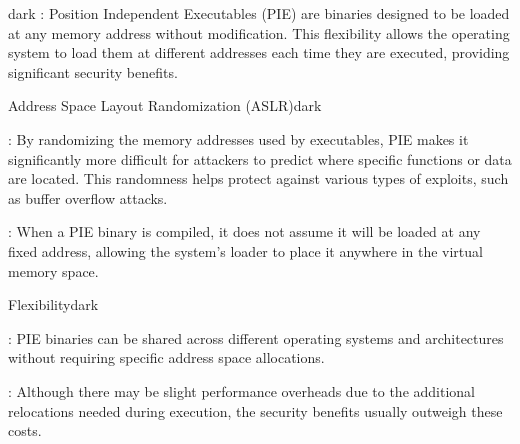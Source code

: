 \label{Position Independent Executables (PIE)}
\begin{baseBoxThree}{}{dark}
    \bigskip
    : Position Independent Executables (PIE) are binaries designed to be loaded at any memory address without modification. This flexibility allows the operating system to load them at different addresses each time they are executed, providing significant security benefits.
    \bigskip
    \label{Address Space Layout Randomization (ASLR)}
    \begin{baseBoxThree}{Address Space Layout Randomization (ASLR)}{dark}
        \begin{posnexItemize}
            \item[\sA] : By randomizing the memory addresses used by executables, PIE makes it significantly more difficult for attackers to predict where specific functions or data are located. This randomness helps protect against various types of exploits, such as buffer overflow attacks.
            \item[\sA] : When a PIE binary is compiled, it does not assume it will be loaded at any fixed address, allowing the system's loader to place it anywhere in the virtual memory space.
        \end{posnexItemize}
    \end{baseBoxThree}
    \smallskip
    \begin{baseBoxThree}{Flexibility}{dark}
        \begin{posnexItemize}
            \item[\sA] : PIE binaries can be shared across different operating systems and architectures without requiring specific address space allocations.
            \item[\sA] : Although there may be slight performance overheads due to the additional relocations needed during execution, the security benefits usually outweigh these costs.
        \end{posnexItemize}
    \end{baseBoxThree}
    \smallskip
\end{baseBoxThree}

